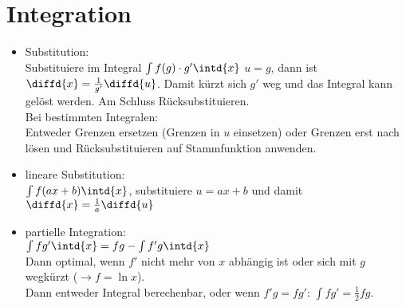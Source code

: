 \documentclass{scrreprt}
\begin{document}
\chapter{Integration}
\begin{itemize}
\item Substitution:\\
Substituiere im Integral $\int f(g)\cdot g' \intd{x}$  $u=g$, dann ist $\diffd{x}=\frac{1}{g'}\diffd{u}$. Damit kürzt sich $g'$ weg und das Integral kann gelöst werden. Am Schluss Rücksubstituieren.\\
Bei bestimmten Integralen:\\
Entweder Grenzen ersetzen (Grenzen in $u$ einsetzen) oder Grenzen erst nach lösen und Rücksubstituieren auf Stammfunktion anwenden.
\item lineare Substitution:\\
$\int f(ax+b)\intd{x}$, substituiere $u=ax+b$ und damit $\diffd{x}=\frac{1}{a}\diffd{u}$
\item partielle Integration:\\
$\int f g' \intd{x}=fg-\int f' g \intd{x}$\\
Dann optimal, wenn $f'$ nicht mehr von $x$ abhängig ist oder sich mit $g$ wegkürzt ($\to f=\ln x$).\\
Dann entweder Integral berechenbar, oder wenn $f'g = fg'$: $\int fg'=\frac{1}{2}fg$.
\end{itemize}
\end{document}
